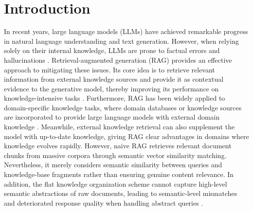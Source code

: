 \documentclass[preprint,12pt,authoryear]{elsarticle}
\begin{document}

\section{Introduction}
\label{sec:introduction}
In recent years, large language models (LLMs) \citep{radford2019language,brown2020language}
have achieved remarkable progress in natural language understanding and text generation.
However, when relying solely on their internal knowledge, LLMs are prone to factual errors
and hallucinations \citep{li2024dawn}.
Retrieval-augmented generation (RAG) \citep{lewis2020retrieval} provides an effective
approach to mitigating these issues. Its core idea is to retrieve relevant information
from external knowledge sources and provide it as contextual evidence to the generative model, thereby improving its performance on knowledge-intensive tasks \citep{guu2020realm,izacard2021leveraging}.
Furthermore, RAG has been widely applied to domain-specific knowledge tasks, where domain databases or knowledge sources are incorporated to provide large language models with external domain knowledge \citep{tu2024reval}. Meanwhile, external knowledge retrieval can also supplement the model with up-to-date knowledge\citep{zhao2026retrieval}, giving RAG clear advantages in domains where knowledge evolves rapidly.
However, naive RAG retrieves relevant document chunks from massive corpora through semantic vector similarity matching. Nevertheless, it merely considers semantic similarity between queries and knowledge-base fragments rather than ensuring genuine content relevance. In addition, the flat knowledge organization scheme cannot capture high-level semantic abstractions of raw documents, leading to semantic-level mismatches and deteriorated response quality when handling abstract queries \citep{sarthi2024raptor}.
\end{document}
